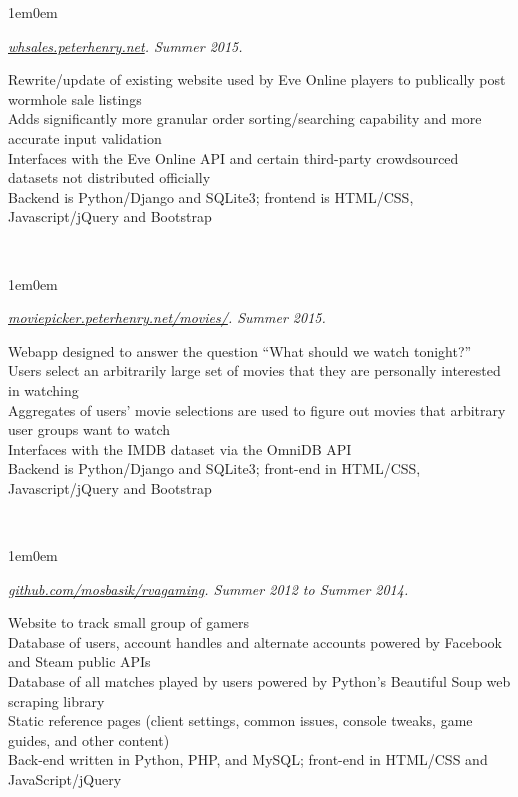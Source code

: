 \documentclass[10pt,letterpaper, full]{article}
\newcommand{\pjtitle}[1]{\renewcommand{\givenpjtitle}{#1}}
\newcommand{\pjtime}[1]{\renewcommand{\givenpjtime}{#1}}
\newcommand{\pjbody}[1]{\renewcommand{\givenpjbody}{#1}}
\newcommand{\givenpjtitle}{REQUIRED!}
\newcommand{\givenpjtime}{REQUIRED!}
\newcommand{\givenpjbody}{REQUIRED!}
\newenvironment{projectenv}
    {
        \begin{adjustwidth}{1em}{0em}
    }
    {
        \textit{\givenpjtitle. \givenpjtime.}

        \begin{minipage}[l]{\textwidth}
            \givenpjbody%
        \end{minipage}\\%


        \end{adjustwidth}
    }
\begin{document}
\begin{projectenv}
    \pjtitle{\href{http://whsales.peterhenry.net}{whsales.peterhenry.net}}
    \pjtime{Summer 2015}
    \pjbody{
        Rewrite/update of existing website used by Eve Online players to
        publically post wormhole sale listings\\
        Adds significantly more granular order sorting/searching capability and
        more accurate input validation\\
        Interfaces with the Eve Online API and certain third-party
        crowdsourced datasets not distributed officially\\
        Backend is Python/Django and SQLite3; frontend is HTML/CSS,
        Javascript/jQuery and Bootstrap
    }%
\end{projectenv}%

\begin{projectenv}
    \pjtitle{\href{http://moviepicker.peterhenry.net/movies/}{moviepicker.peterhenry.net/movies/}}
    \pjtime{Summer 2015}
    \pjbody{
        Webapp designed to answer the question “What should we watch
        tonight?”\\
        Users select an arbitrarily large set of movies that they are
        personally interested in watching\\
        Aggregates of users’ movie selections are used to figure out movies
        that arbitrary user groups want to watch\\
        Interfaces with the IMDB dataset via the OmniDB API\\
        Backend is Python/Django and SQLite3; front-end in HTML/CSS,
        Javascript/jQuery and Bootstrap
    }%
\end{projectenv}%

\begin{projectenv}%
    \pjtitle{\href{https://github.com/mosbasik/rvagaming}{github.com/mosbasik/rvagaming}}
    \pjtime{Summer 2012 to Summer 2014}
    \pjbody{
        Website to track small group of gamers\\
        Database of users, account handles and alternate accounts powered by
        Facebook and Steam public APIs\\
        Database of all matches played by users powered by Python’s Beautiful
        Soup web scraping library\\
        Static reference pages (client settings, common issues, console tweaks,
        game guides, and other content)\\
        Back-end written in Python, PHP, and MySQL; front-end in HTML/CSS and
        JavaScript/jQuery\\
    }%
\end{projectenv}%
\end{document}
